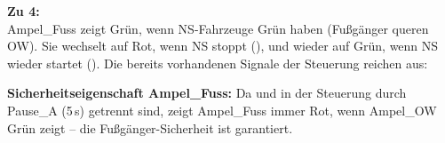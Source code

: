 \begin{loesung}
\textbf{Zu 4:}\\
Ampel\_Fuss zeigt Grün, wenn NS-Fahrzeuge Grün haben (Fußgänger queren OW). Sie wechselt
auf Rot, wenn NS stoppt (), und wieder auf Grün, wenn NS wieder startet
(). Die bereits vorhandenen Signale der Steuerung reichen aus:

\begin{center}
\end{center}

\textbf{Sicherheitseigenschaft Ampel\_Fuss:} Da  und  in der
Steuerung durch Pause\_A (5\,s) getrennt sind, zeigt Ampel\_Fuss immer Rot, wenn Ampel\_OW
Grün zeigt -- die Fußgänger-Sicherheit ist garantiert.
\end{loesung}


